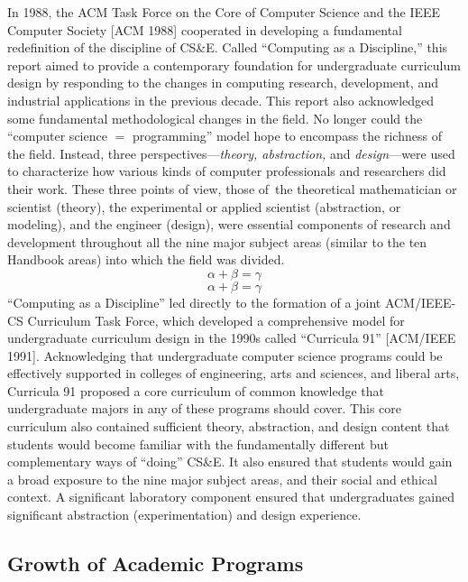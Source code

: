 In 1988, the ACM Task Force on the Core of Computer Science and
the IEEE Computer Society [ACM 1988] cooperated in developing a
fundamental redefinition of the discipline of CS\&E. Called
``Computing as a Discipline,'' this report aimed to provide a
contemporary foundation for undergraduate curriculum design by
responding to the changes in computing research, development,
and industrial applications in the previous decade. This report
also acknowledged some fundamental methodological changes in the
field. No longer could the ``computer science $=$ programming''
model hope to encompass the richness of the field. Instead,
three perspectives---{\it theory, abstraction,} and {\it design}---were
used to characterize how various kinds of computer professionals
and researchers did their work. These three points of view,
those of\, the theoretical mathematician or scientist (theory),
the experimental or applied scientist (abstraction, or
modeling), and the engineer (design), were essential
components of research and development throughout all the nine
major subject areas (similar to the ten Handbook areas) into
which the field was divided.
\begin{equation}
\alpha+\beta=\gamma
\end{equation}
\begin{equation}
\alpha+\beta=\gamma
\end{equation}
``Computing as a Discipline'' led directly to the formation of a
joint ACM/IEEE-CS Curriculum Task Force, which developed a
comprehensive model for undergraduate curriculum design in the
1990s called ``Curricula 91'' [ACM/IEEE 1991]. Acknowledging that
undergraduate computer science programs could be effectively
supported in colleges of engineering, arts and sciences, and
liberal arts, Curricula 91 proposed a core curriculum of common
knowledge that undergraduate majors in any of these programs
should cover. This core curriculum also contained sufficient
theory, abstraction, and design content that students would
become familiar with the fundamentally different but
complementary ways of ``doing'' CS\&E. It also ensured that
students would gain a broad exposure to the nine major subject
areas, and their social and ethical context. A significant
laboratory component ensured that undergraduates gained
significant abstraction (experimentation) and design experience.



\enlargethispage{-1pc}
\subsection{Growth of Academic Programs}

